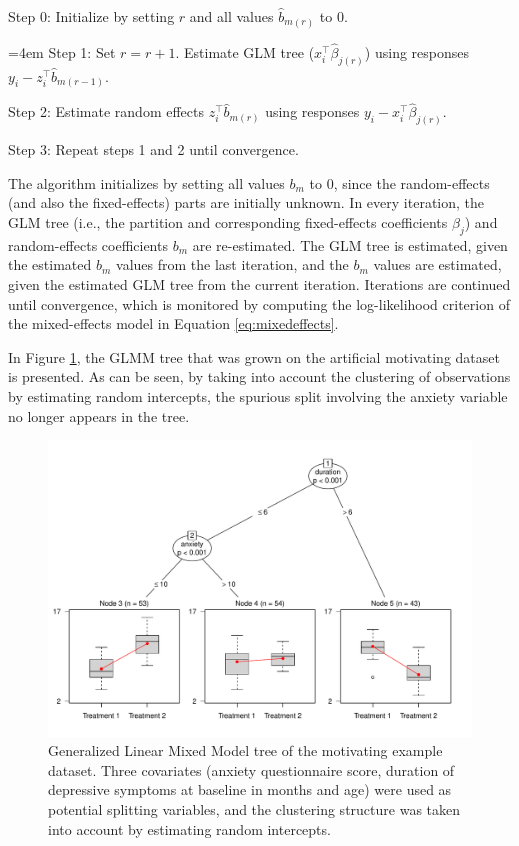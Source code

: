 \documentclass[nobf,doc]{apa}
\begin{document}
\vspace{5pt}
\noindent Step 0: Initialize by setting $r$ and all values $\hat{b}_{m(r)}$ to 0.

\vspace{5pt}
\noindent \hangindent=4em Step 1: Set $r = r+1$. Estimate GLM tree ($x_{i}^{\top}\hat{\beta}_{j(r)}$) using responses $y_i - z_{i}^{\top}\hat{b}_{m(r-1)}$.

\vspace{5pt}
\noindent Step 2: Estimate random effects $z_{i}^{\top}\hat{b}_{m(r)}$ using responses $y_i - x_{i}^{\top}\hat{\beta}_{j(r)}$.

\vspace{5pt}
\noindent Step 3: Repeat steps 1 and 2 until convergence.

\vspace{5pt}
The algorithm initializes by setting all values $b_m$ to $0$, since the random-effects (and also the fixed-effects) parts are initially unknown. In every iteration, the GLM tree (i.e., the partition and corresponding fixed-effects coefficients $\beta_j$) and random-effects coefficients $b_m$ are re-estimated. The GLM tree is estimated, given the estimated $b_m$ values from the last iteration, and the $b_m$ values are estimated, given the estimated GLM tree from the current iteration. Iterations are continued until convergence, which is monitored by computing the log-likelihood criterion of the mixed-effects model in Equation \ref{eq:mixedeffects}. 

In Figure \ref{fig:example_glimmertree}, the GLMM tree that was grown on the artificial motivating dataset is presented. As can be seen, by taking into account the clustering of observations by estimating random intercepts, the spurious split involving the anxiety variable no longer appears in the tree. 

\begin{figure}[!h]
    \includegraphics[width=12cm]{glimmertree_example.pdf}
    \caption{Generalized Linear Mixed Model tree of the motivating example dataset. Three covariates (anxiety questionnaire score, duration of depressive symptoms at baseline in months and age) were used as potential splitting variables, and the clustering structure was taken into account by estimating random intercepts.}
    \label{fig:example_glimmertree}
\end{figure}
\end{document}

